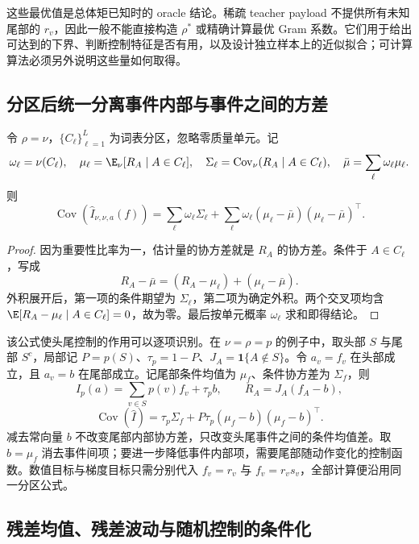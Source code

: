 这些最优值是总体矩已知时的 oracle 结论。稀疏 teacher payload 不提供所有未知尾部的 $r_v$，因此一般不能直接构造 $\rho^*$ 或精确计算最优 Gram 系数。它们用于给出可达到的下界、判断控制特征是否有用，以及设计独立样本上的近似拟合；可计算算法必须另外说明这些量如何取得。

\subsection{分区后统一分离事件内部与事件之间的方差}

\begin{theorem}
\label{thm:kl-master-partition}
令 $\rho=\nu$，$\{C_\ell\}_{\ell=1}^L$ 为词表分区，忽略零质量单元。记
\[
 \omega_\ell=\nu(C_\ell),\quad
 \mu_\ell=\E_\nu[R_A\mid A\in C_\ell],\quad
 \Sigma_\ell=\operatorname{Cov}_\nu(R_A\mid A\in C_\ell),\quad
 \bar\mu=\sum_\ell\omega_\ell\mu_\ell.
\]
则
\begin{equation}
 \operatorname{Cov}(\widehat I_{\nu,\nu,a}(f))
 =\sum_\ell\omega_\ell\Sigma_\ell
  +\sum_\ell\omega_\ell(\mu_\ell-\bar\mu)(\mu_\ell-\bar\mu)^\top.
 \label{eq:kl-master-partition}
\end{equation}
\end{theorem}

\begin{proof}
因为重要性比率为一，估计量的协方差就是 $R_A$ 的协方差。条件于 $A\in C_\ell$，写成
\[
 R_A-\bar\mu=(R_A-\mu_\ell)+(\mu_\ell-\bar\mu).
\]
外积展开后，第一项的条件期望为 $\Sigma_\ell$，第二项为确定外积。两个交叉项均含 $\E[R_A-\mu_\ell\mid A\in C_\ell]=0$，故为零。最后按单元概率 $\omega_\ell$ 求和即得结论。
\end{proof}

该公式使头尾控制的作用可以逐项识别。在 $\nu=\rho=p$ 的例子中，取头部 $S$ 与尾部 $S^c$，局部记 $P=p(S)$、$\tau_p=1-P$、$J_A=\mathbf1\{A\notin S\}$。令 $a_v=f_v$ 在头部成立，且 $a_v=b$ 在尾部成立。记尾部条件均值为 $\mu_f$、条件协方差为 $\Sigma_f$，则
\[
 I_p(a)=\sum_{v\in S}p(v)f_v+\tau_pb,\qquad
 R_A=J_A(f_A-b),
\]
\begin{equation}
 \operatorname{Cov}(\widehat I)
 =\tau_p\Sigma_f+P\tau_p(\mu_f-b)(\mu_f-b)^\top.
 \label{eq:kl-master-head-tail}
\end{equation}
减去常向量 $b$ 不改变尾部内部协方差，只改变头尾事件之间的条件均值差。取 $b=\mu_f$ 消去事件间项；要进一步降低事件内部项，需要尾部随动作变化的控制函数。数值目标与梯度目标只需分别代入 $f_v=r_v$ 与 $f_v=r_vs_v$，全部计算便沿用同一分区公式。

\subsection{残差均值、残差波动与随机控制的条件化}

